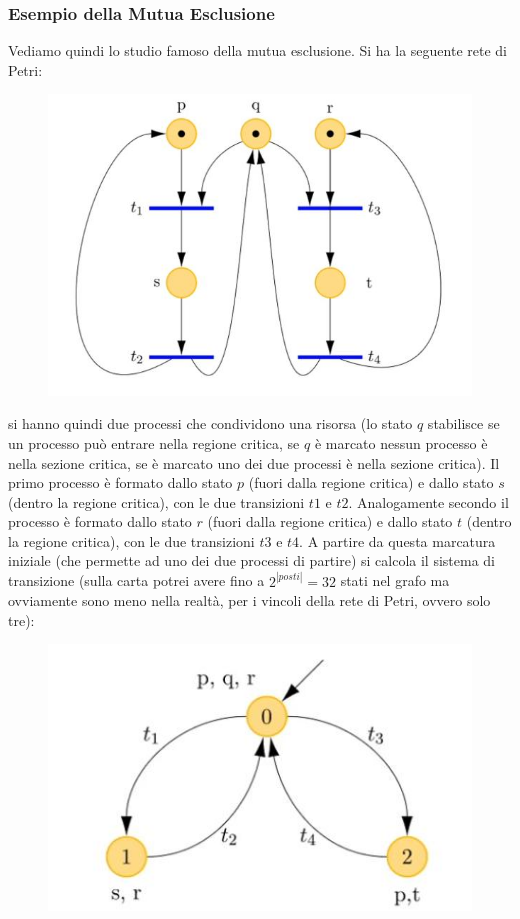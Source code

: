 \documentclass[a4paper,12pt, oneside]{book}
\begin{document}
\subsubsection{Esempio della Mutua Esclusione}
Vediamo quindi lo studio famoso della mutua esclusione. Si ha la seguente rete
di Petri:
\begin{figure}[H]
  \centering
  \includegraphics[scale = 0.45]{img/me.jpg}
\end{figure}
si hanno quindi due processi che condividono una risorsa (lo stato $q$
stabilisce se un processo può entrare nella regione critica, se $q$ è marcato
nessun processo è nella sezione critica, se è marcato uno dei due processi è
nella sezione critica).
Il primo processo è formato dallo stato $p$ (fuori dalla regione critica) e
dallo stato $s$ (dentro la regione critica), con le due transizioni $t1$ e
$t2$. Analogamente secondo il processo è formato dallo stato $r$ (fuori dalla
regione critica) e dallo stato $t$ (dentro la regione critica), con le due
transizioni $t3$ e $t4$.
\newpage
A partire da questa marcatura iniziale (che permette ad uno dei due processi di
partire) si calcola il sistema di transizione (sulla carta potrei avere fino a
$2^{|posti|}=32$ stati nel grafo ma ovviamente sono meno nella realtà, per i
vincoli della rete di Petri, ovvero solo tre):
\begin{figure}[H]
  \centering
  \includegraphics[scale = 0.45]{img/me2.jpg}
\end{figure}
\end{document}
